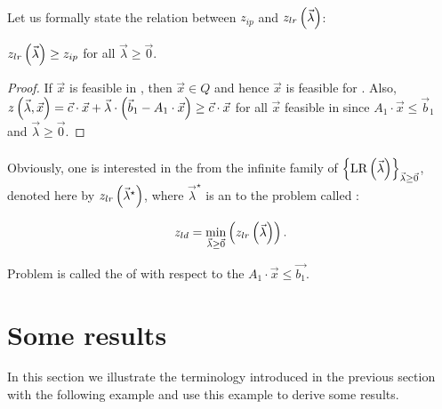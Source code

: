 \paragraph{}
Let us formally state the relation between $z_{ip}$ and $z_{lr}\left( \vec{\lambda} \right)$:
\begin{theorem}
$z_{lr}\left( \vec{\lambda} \right)\geq z_{ip}$ for all $\vec{\lambda}\geq\vec{0}$.
\begin{proof}
If $\vec{x}$ is feasible in , then $\vec{x}\in Q$ and hence $\vec{x}$ is feasible for . Also, $z\left( \vec{\lambda},\vec{x} \right)=\vec{c}\cdot\vec{x}+\vec{\lambda}\cdot\left( \vec{b}_1-A_1\cdot\vec{x} \right)\geq\vec{c}\cdot\vec{x}$ for all $\vec{x}$ feasible in  since $A_1\cdot\vec{x}\leq\vec{b}_1$ and $\vec{\lambda}\geq\vec{0}$.
\end{proof}
\end{theorem}

\paragraph{}
Obviously, one is interested in the  from the infinite family of  $\left\{ \mbox{LR}\left( \vec{\lambda} \right) \right\}_{\vec{\lambda}\geq\vec{0}}$,
denoted here by $z_{lr}\left( \vec{\lambda}^{\star} \right)$, where $\vec{\lambda}^{\star}$ is an  to the problem called :

\begin{equation}
z_{ld}=\min_{\vec{\lambda}\geq\vec{0}}\left( z_{lr}\left( \vec{\lambda} \right) \right).
\end{equation}

Problem  is called the  of  with respect to the  $A_1\cdot\vec{x}\leq\vec{b_1}$.

\section{Some results}
In this section we illustrate the terminology introduced in the previous section with the following example and use this example to derive some results.


